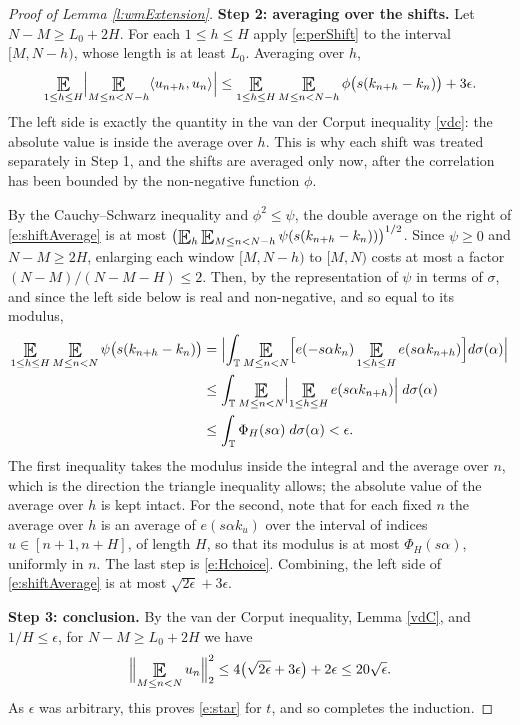 \begin{proof}[Proof of Lemma \ref{l:wmExtension}]
\medskip
\noindent\textbf{Step 2: averaging over the shifts.}
Let $N - M \geq L_0 + 2H$.  For each $1\leq h \leq H$ apply \eqref{e:perShift} to the interval $[M, N-h)$, whose length is at least $L_0$.  Averaging over $h$,
\begin{equation} \label{e:shiftAverage}
\Expectation_{1\leq h\leq H} \Bigl\lvert \Expectation_{M\leq n<N-h} \langle u_{n+h}, u_n\rangle \Bigr\rvert
\leq \Expectation_{1\leq h\leq H} \Expectation_{M\leq n<N-h} \phi \bigl(s(k_{n+h}-k_n)\bigr) + 3 \epsilon .
\end{equation}
The left side is exactly the quantity in the van der Corput inequality \eqref{vdc}: the absolute value is inside the average over $h$.
This is why each shift was treated separately in Step 1, and the shifts are averaged only now, after the correlation has been bounded by the non-negative function $\phi$.

By the Cauchy--Schwarz inequality and $\phi ^2 \leq \psi$, the double average on the right of \eqref{e:shiftAverage} is at most
$\bigl( \Expectation_{h} \Expectation_{M\leq n<N-h} \psi (s(k_{n+h}-k_n)) \bigr) ^{1/2}$.
Since $\psi \geq 0$ and $N-M \geq 2H$, enlarging each window $[M,N-h)$ to $[M,N)$ costs at most a factor $(N-M)/(N-M-H) \leq 2$.
Then, by the representation of $\psi$ in terms of $\sigma$, and since the left side below is real and non-negative, and so equal to its modulus, 
\begin{align}
\Expectation_{1\leq h\leq H} \Expectation_{M\leq n<N} \psi \bigl(s(k_{n+h}-k_n)\bigr)
&= \Bigl\lvert \int_{\mathbb T} \Expectation_{M\leq n<N} \Bigl[ e(-s\alpha k_n) \Expectation_{1\leq h\leq H} e(s \alpha k_{n+h}) \Bigr] d \sigma ( \alpha ) \Bigr\rvert \\
&\leq \int_{\mathbb T} \Expectation_{M\leq n<N} \Bigl\lvert \Expectation_{1\leq h\leq H} e(s \alpha k_{n+h}) \Bigr\rvert \; d \sigma ( \alpha ) \\
&\leq \int_{\mathbb T} \Phi _H(s \alpha ) \;d \sigma ( \alpha ) < \epsilon .
\end{align}
The first inequality takes the modulus inside the integral and the average over $n$, which is the direction the triangle inequality allows; 
the absolute value of the average over $h$ is kept intact.  For the second, note that for each fixed $n$ the average over $h$ is an average of $e(s\alpha k_u)$ 
over the interval of indices $u \in [n+1, n+H]$, of length $H$, so that its modulus is at most $\Phi _H(s \alpha )$, uniformly in $n$.  The last step is \eqref{e:Hchoice}.
Combining, the left side of \eqref{e:shiftAverage} is at most $\sqrt{2 \epsilon } + 3 \epsilon$.

\medskip
\noindent\textbf{Step 3: conclusion.}
By the van der Corput inequality, Lemma \ref{vdC}, and $1/H \leq \epsilon$, for $N - M \geq L_0 + 2H$ we have
\begin{equation}
\Bigl\lVert \Expectation_{M\leq n<N} u_n \Bigr\rVert _2 ^2 \leq 4 \bigl( \sqrt{2 \epsilon } + 3 \epsilon \bigr) + 2 \epsilon \leq 20 \sqrt \epsilon .
\end{equation}
As $\epsilon$ was arbitrary, this proves \eqref{e:star} for $t$, and so completes the induction.
\end{proof}
